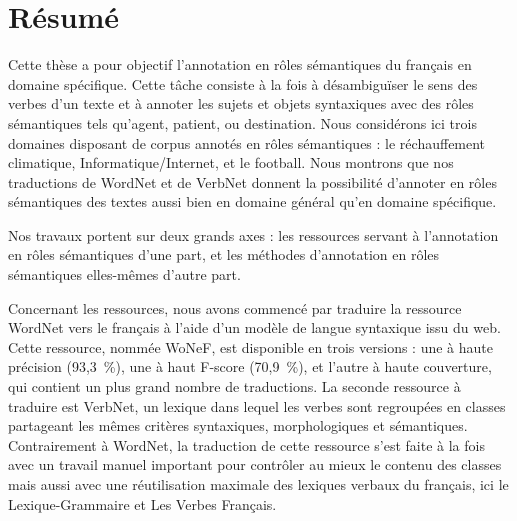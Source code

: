 \documentclass[oneside,parskip,draft]{scrbook}
\date{\Large
    \begin{minipage}[t]{0.61\linewidth}
    \begin{center}\textbf{Thèse sous la direction de :}\end{center}
    Laurence \textsc{Danlos} et Gaël \textsc{de Chalendar}
    \begin{center}~\end{center}
    \begin{center}~\end{center}
    \end{minipage}
}
\title{}
\begin{document}
\maketitle

\frontmatter



\chapter{Résumé}

Cette thèse a pour objectif l'annotation en rôles sémantiques du français en
domaine spécifique. Cette tâche consiste à la fois à désambiguïser le sens des
verbes d'un texte et à annoter les sujets et objets syntaxiques avec des rôles
sémantiques tels qu'agent, patient, ou destination. Nous considérons ici trois
domaines disposant de corpus annotés en rôles sémantiques : le réchauffement
climatique, Informatique/Internet, et le football. Nous montrons que nos
traductions de WordNet et de VerbNet donnent la possibilité d'annoter en rôles
sémantiques des textes aussi bien en domaine général qu'en domaine spécifique.

Nos travaux portent sur deux grands axes : les ressources servant à
l'annotation en rôles sémantiques d'une part, et les méthodes d'annotation en
rôles sémantiques elles-mêmes d'autre part.

Concernant les ressources, nous avons commencé par traduire la ressource
WordNet vers le français à l'aide d'un modèle de langue syntaxique issu du web.
Cette ressource, nommée WoNeF, est disponible en trois versions : une à haute
précision (93,3~\%), une à haut F-score (70,9~\%), et l'autre à haute
couverture, qui contient un plus grand nombre de traductions. La seconde
ressource à traduire est VerbNet, un lexique dans lequel les verbes sont
regroupées en classes partageant les mêmes critères syntaxiques, morphologiques
et sémantiques. Contrairement à WordNet, la traduction de cette ressource s'est
faite à la fois avec un travail manuel important pour contrôler au mieux le
contenu des classes mais aussi avec une réutilisation maximale des lexiques
verbaux du français, ici le Lexique-Grammaire et Les Verbes Français.
\end{document}

